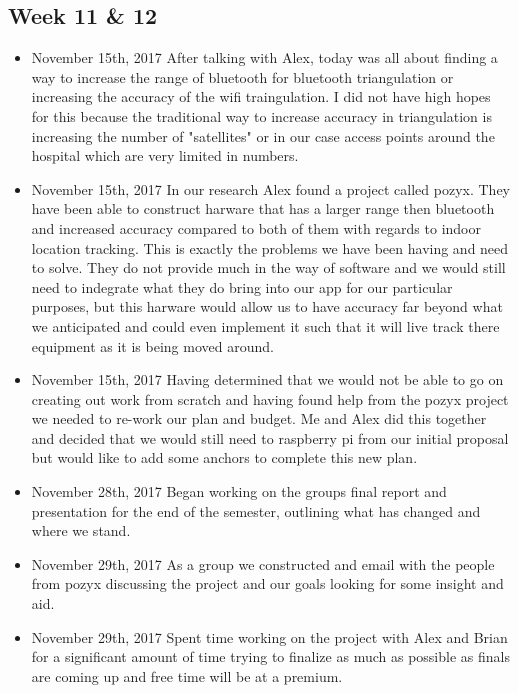 \documentclass[12pt]{article}
\begin{document}
	\subsection{Week 11 \& 12}
		\begin{itemize}
			\item November 15th, 2017 After talking with Alex, today was all about finding a way to increase the range of bluetooth for bluetooth triangulation or increasing the accuracy of the wifi traingulation.  I did not have high hopes for this because the traditional way to increase accuracy in triangulation is increasing the number of "satellites" or in our case access points around the hospital which are very limited in numbers.
			\item November 15th, 2017 In our research Alex found a project called pozyx.  They have been able to construct harware that has a larger range then bluetooth and increased accuracy compared to both of them with regards to indoor location tracking.  This is exactly the problems we have been having and need to solve.  They do not provide much in the way of software and we would still need to indegrate what they do bring into our app for our particular purposes, but this harware would allow us to have accuracy far beyond what we anticipated and could even implement it such that it will live track there equipment as it is being moved around.
			\item November 15th, 2017 Having determined that we would not be able to go on creating out work from scratch and having found help from the pozyx project we needed to re-work our plan and budget.  Me and Alex did this together and decided that we would still need to raspberry pi from our initial proposal but would like to add some anchors to complete this new plan.
			\item November 28th, 2017 Began working on the groups final report and presentation for the end of the semester, outlining what has changed and where we stand.
			\item November 29th, 2017 As a group we constructed and email with the people from pozyx discussing the project and our goals looking for some insight and aid.
			\item November 29th, 2017 Spent time working on the project with Alex and Brian for a significant amount of time trying to finalize as much as possible as finals are coming up and free time will be at a premium.

\end{itemize}
\end{document}
